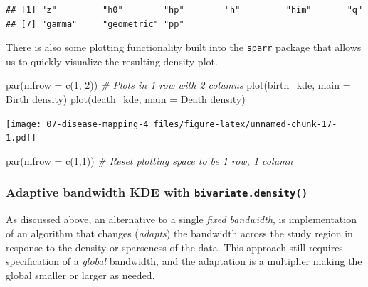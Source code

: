 \documentclass[
]{book}
\newenvironment{Shaded}{\begin{snugshade}}{\end{snugshade}}
\newcommand{\AttributeTok}[1]{\textcolor[rgb]{0.77,0.63,0.00}{#1}}
\newcommand{\CommentTok}[1]{\textcolor[rgb]{0.56,0.35,0.01}{\textit{#1}}}
\newcommand{\DecValTok}[1]{\textcolor[rgb]{0.00,0.00,0.81}{#1}}
\newcommand{\FunctionTok}[1]{\textcolor[rgb]{0.00,0.00,0.00}{#1}}
\newcommand{\NormalTok}[1]{#1}
\newcommand{\StringTok}[1]{\textcolor[rgb]{0.31,0.60,0.02}{#1}}
\begin{document}
\begin{verbatim}
## [1] "z"         "h0"        "hp"        "h"         "him"       "q"        
## [7] "gamma"     "geometric" "pp"
\end{verbatim}

There is also some plotting functionality built into the \texttt{sparr} package that allows us to quickly visualize the resulting density plot.

\begin{Shaded}
\begin{Highlighting}[]
\FunctionTok{par}\NormalTok{(}\AttributeTok{mfrow =} \FunctionTok{c}\NormalTok{(}\DecValTok{1}\NormalTok{, }\DecValTok{2}\NormalTok{)) }\CommentTok{\# Plots in 1 row with 2 columns}
\FunctionTok{plot}\NormalTok{(birth\_kde, }\AttributeTok{main =} \StringTok{\textquotesingle{}Birth density\textquotesingle{}}\NormalTok{)}
\FunctionTok{plot}\NormalTok{(death\_kde, }\AttributeTok{main =} \StringTok{\textquotesingle{}Death density\textquotesingle{}}\NormalTok{)}
\end{Highlighting}
\end{Shaded}

\texttt{[image: 07-disease-mapping-4\_files/figure-latex/unnamed-chunk-17-1.pdf]}

\begin{Shaded}
\begin{Highlighting}[]
\FunctionTok{par}\NormalTok{(}\AttributeTok{mfrow =} \FunctionTok{c}\NormalTok{(}\DecValTok{1}\NormalTok{,}\DecValTok{1}\NormalTok{))  }\CommentTok{\# Reset plotting space to be 1 row, 1 column}
\end{Highlighting}
\end{Shaded}

\hypertarget{adaptive-bandwidth-kde-with-bivariate.density}{%
\subsubsection{\texorpdfstring{Adaptive bandwidth KDE with \texttt{bivariate.density()}}{Adaptive bandwidth KDE with bivariate.density()}}\label{adaptive-bandwidth-kde-with-bivariate.density}}

As discussed above, an alternative to a single \emph{fixed bandwidth}, is implementation of an algorithm that changes (\emph{adapts}) the bandwidth across the study region in response to the density or sparseness of the data. This approach still requires specification of a \emph{global} bandwidth, and the adaptation is a multiplier making the global smaller or larger as needed.
\end{document}
